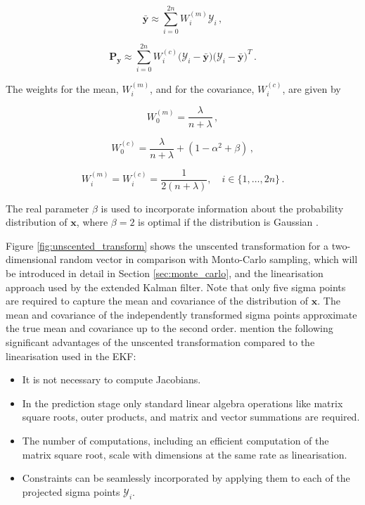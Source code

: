 \begin{equation}
  \bar{\bm{y}} \approx \sum^{2n}_{i = 0} W_i^{(m)} \mathcal{Y}_i\,,
\end{equation}

\begin{equation}
  \bm{P}_{\bm{y}} \approx \sum^{2n}_{i = 0} W_i^{(c)} \big(\mathcal{Y}_i-\bar{\bm{y}}\big)\big(\mathcal{Y}_i-\bar{\bm{y}}\big)^T\,.
\end{equation}

\noindent
The weights for the mean, $W_i^{(m)}$, and for the covariance, $W_i^{(c)}$, are given by

\begin{equation}\label{eq:weights1}
  W^{(m)}_0 = \frac{\lambda}{n + \lambda} \,,
\end{equation}

\begin{equation}\label{eq:weights2}
  W^{(c)}_0 = \frac{\lambda}{n + \lambda} + (1- \alpha^2 + \beta) \,,
\end{equation}

\begin{equation}\label{eq:weights3}
  W_i^{(m)} = W_i^{(c)} = \frac{1}{2(n + \lambda)}, \quad i \in \{1, \dots, 2n\}\,.
\end{equation}

\noindent
The real parameter $\beta$ is used to incorporate information about the probability distribution of $\bm{x}$, where $\beta = 2$ is optimal if the distribution is Gaussian \cite{van2001unscented}.


Figure \ref{fig:unscented_transform} shows the unscented transformation for a two-dimensional random vector in comparison with Monto-Carlo sampling, which will be introduced in detail in Section \ref{sec:monte_carlo}, and the linearisation approach used by the extended Kalman filter. Note that only five sigma points are required to capture the mean and covariance of the distribution of $\bm{x}$. The mean and covariance of the independently transformed sigma points approximate the true mean and covariance up to the second order. \citeauthor{Julier96ageneral} mention the following significant advantages of the unscented transformation compared to the linearisation used in the EKF:

\begin{itemize}
	\item It is not necessary to compute Jacobians.
	\item In the prediction stage only standard linear algebra operations like matrix square roots, outer products, and matrix and vector summations are required.
	\item The number of computations, including an efficient computation of the matrix square root, scale with dimensions at the same rate as linearisation.
	\item Constraints can be seamlessly incorporated by applying them to each of the projected sigma points $\mathcal{Y}_i$.
\end{itemize}



